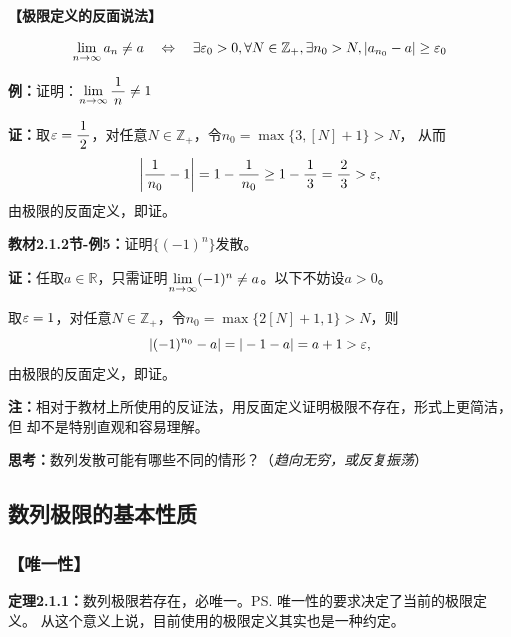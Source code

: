 \begin{shaded}
	{\bf 【极限定义的反面说法】}
	
	$$\lim\limits_{n\to\infty} a_n\neq a\quad\Leftrightarrow\quad\exists\varepsilon_0>0,
	\forall N\in\mathbb{Z}_+,\exists n_0>N,|a_{n_0}-a|\geq\varepsilon_0$$
	
	{\bf 例：}证明：$\lim\limits_{n\to\infty}\displaystyle\frac{\,{1}\,}{\,{n}\,}\neq 1$
	
	{\bf 证：}取$\varepsilon=\displaystyle\frac{\,{1}\,}{\,{2}\,}$，对任意$N\in\mathbb{Z}_+$，令$n_0=\max\{3,[N]+1\}>N$，
	从而
	$$\left|\displaystyle\frac{\,{1}\,}{\,{n_0}\,}-1\right|=1-\displaystyle\frac{\,{1}\,}{\,{n_0}\,}\geq 1-\displaystyle\frac{\,{1}\,}{\,{3}\,}=\displaystyle\frac{\,{2}\,}{\,{3}\,}>\varepsilon,$$
	由极限的反面定义，即证。
	
	{\bf 教材2.1.2节-例5：}证明$\{(-1)^n\}$发散。
	
	{\bf 证：}任取$a\in\mathbb{R}$，只需证明$\lim\limits_{n\to\infty}(-1)^n\ne a$。以下不妨设$a>0$。
	
	取$\varepsilon=1$，对任意$N\in\mathbb{Z}_+$，令$n_0=\max\{2[N]+1,1\}>N$，则
	$$\left|(-1)^{n_0}-a\right|=|-1-a|=a+1>\varepsilon,$$
	由极限的反面定义，即证。
	
	{\bf 注：}相对于教材上所使用的反证法，用反面定义证明极限不存在，形式上更简洁，但
	却不是特别直观和容易理解。
	
	{\bf 思考：}数列发散可能有哪些不同的情形？（{\it 趋向无穷，或反复振荡}）
	
\end{shaded}

\subsection{数列极限的基本性质}

\subsubsection{【唯一性】}

{\bf 定理2.1.1：}数列极限若存在，必唯一。\ps{唯一性的要求决定了当前的极限定义。
从这个意义上说，目前使用的极限定义其实也是一种约定。}

\begin{center}
\end{center}

